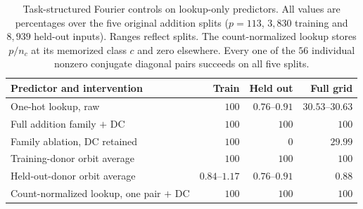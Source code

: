 \begin{table}[t]
\centering
\caption{Task-structured Fourier controls on lookup-only predictors. All values are percentages over the five original addition splits ($p=113$, $3{,}830$ training and $8{,}939$ held-out inputs). Ranges reflect splits. The count-normalized lookup stores $p/n_c$ at its memorized class $c$ and zero elsewhere. Every one of the $56$ individual nonzero conjugate diagonal pairs succeeds on all five splits.}
\label{tab:fourier-memorizer}
\small
\begin{tabular}{lrrr}
\toprule
Predictor and intervention & Train & Held out & Full grid \\
\midrule
One-hot lookup, raw & $100$ & $0.76$--$0.91$ & $30.53$--$30.63$ \\
Full addition family $+$ DC & $100$ & $100$ & $100$ \\
Family ablation, DC retained & $100$ & $0$ & $29.99$ \\
Training-donor orbit average & $100$ & $100$ & $100$ \\
Held-out-donor orbit average & $0.84$--$1.17$ & $0.76$--$0.91$ & $0.88$ \\
Count-normalized lookup, one pair $+$ DC & $100$ & $100$ & $100$ \\
\bottomrule
\end{tabular}
\end{table}
